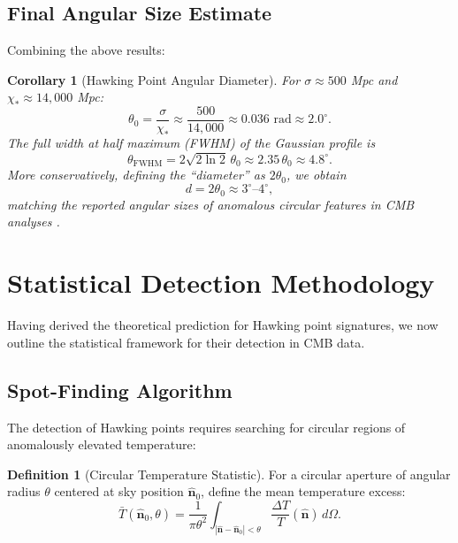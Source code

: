 \documentclass[11pt,a4paper]{article}
\theoremstyle{plain}
\newtheorem{corollary}[theorem]{Corollary}
\theoremstyle{definition}
\newtheorem{definition}[theorem]{Definition}
\theoremstyle{remark}
\begin{document}
\subsection{Final Angular Size Estimate}

Combining the above results:

\begin{corollary}[Hawking Point Angular Diameter]\label{cor:angular_diameter}
For $\sigma \approx 500$ Mpc and $\chi_\ast \approx 14,000$ Mpc:
\begin{equation}
    \theta_0 = \frac{\sigma}{\chi_\ast} \approx \frac{500}{14,000} \approx 0.036 \text{ rad} \approx 2.0^\circ.
\end{equation}
The full width at half maximum (FWHM) of the Gaussian profile is
\begin{equation}
    \theta_{\text{FWHM}} = 2\sqrt{2\ln 2} \, \theta_0 \approx 2.35 \, \theta_0 \approx 4.8^\circ.
\end{equation}
More conservatively, defining the ``diameter'' as $2\theta_0$, we obtain
\begin{equation}\label{eq:diameter_final}
    d = 2\theta_0 \approx 3^\circ\text{--}4^\circ,
\end{equation}
matching the reported angular sizes of anomalous circular features in CMB analyses \cite{hawking_points_2020}.
\end{corollary}

\section{Statistical Detection Methodology}\label{sec:statistics}

Having derived the theoretical prediction for Hawking point signatures, we now outline the statistical framework for their detection in CMB data.

\subsection{Spot-Finding Algorithm}

The detection of Hawking points requires searching for circular regions of anomalously elevated temperature:

\begin{definition}[Circular Temperature Statistic]\label{def:circular_stat}
For a circular aperture of angular radius $\theta$ centered at sky position $\hat{\bm{n}}_0$, define the mean temperature excess:
\begin{equation}\label{eq:mean_temp_excess}
    \bar{T}(\hat{\bm{n}}_0, \theta) = \frac{1}{\pi\theta^2} \int_{|\hat{\bm{n}} - \hat{\bm{n}}_0| < \theta} \frac{\Delta T}{T}(\hat{\bm{n}}) \, d\Omega.
\end{equation}
\end{definition}
\end{document}
